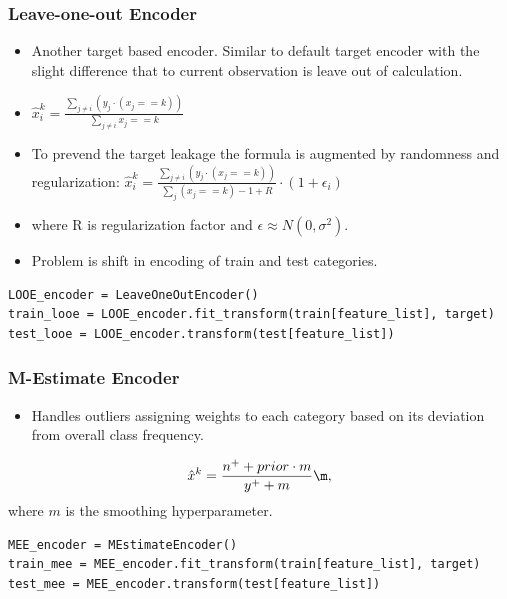 \documentclass{beamer}
\begin{document}
    \begin{frame}[fragile]
        \frametitle{Leave-one-out Encoder}
        \begin{itemize}
            \item Another target based encoder. Similar to default target encoder with the slight
            difference that to current observation is leave out of calculation.
            \pause
            \item $\hat{x}^k_i = \frac{\sum_{j\neq i} (y_j \cdot (x_j == k))}{\sum_{j\neq i} x_j
                == k}$
            \pause
            \item To prevend the target leakage the formula is augmented by randomness and
            regularization: $\hat{x}^k_i = \frac{\sum_{j\neq i} (y_j \cdot (x_j == k))}{\sum_
                    {j} (x_j== k) - 1 + R} \cdot (1 + \epsilon_i)$
            \item where R is regularization factor and $ \epsilon \approx N(0, \sigma^2)$.
            \pause
            \item Problem is shift in encoding of train and test categories.
            \pause
        \end{itemize}

        \begin{lstlisting}
LOOE_encoder = LeaveOneOutEncoder()
train_looe = LOOE_encoder.fit_transform(train[feature_list], target)
test_looe = LOOE_encoder.transform(test[feature_list])
        \end{lstlisting}
    \end{frame}

    \begin{frame}[fragile]
        \frametitle{M-Estimate Encoder}
        \begin{itemize}
            \item Handles outliers assigning weights to each category based on its deviation from
            overall class frequency.
        \end{itemize}

        \[
            \hat{x}^k = \frac{n^+ + prior \cdot m}{y^+ + m} \m ,
        \] where $m$ is the smoothing hyperparameter.

        \begin{lstlisting}
MEE_encoder = MEstimateEncoder()
train_mee = MEE_encoder.fit_transform(train[feature_list], target)
test_mee = MEE_encoder.transform(test[feature_list])
        \end{lstlisting}
    \end{frame}
\end{document}
